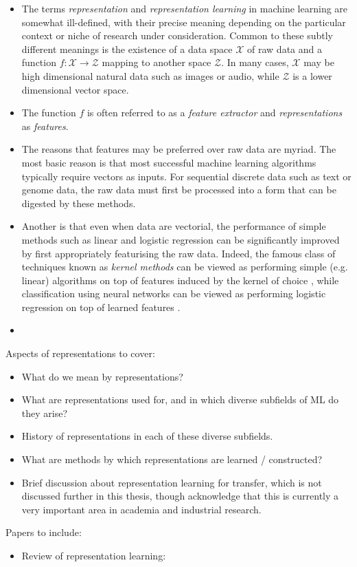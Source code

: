 \begin{itemize}
\item The terms \emph{representation} and \emph{representation learning} in machine learning are somewhat ill-defined, with their precise meaning depending on the particular context or niche of research under consideration. Common to these subtly different meanings is the existence of a data space $\mathcal{X}$ of raw data and a function $f:\mathcal{X} \to \mathcal{Z}$ mapping to another space $\mathcal{Z}$. In many cases, $\mathcal{X}$ may be high dimensional natural data such as images or audio, while $\mathcal{Z}$ is a lower dimensional vector space.
\item The function $f$ is often referred to as a \emph{feature extractor} and \emph{representations} as \emph{features}.
\item The reasons that features may be preferred over raw data are myriad. The most basic reason is that most successful machine learning algorithms typically require vectors as inputs. For sequential discrete data such as text or genome data, the raw data must first be processed into a form that can be digested by these methods.
\item Another is that even when data are vectorial, the performance of simple methods such as linear and logistic regression can be significantly improved by first appropriately featurising the raw data. Indeed, the famous class of techniques known as \emph{kernel methods} can be viewed as performing simple (e.g. linear) algorithms on top of features induced by the kernel of choice \citep{scholkopf2001learning, rasmussen2006gaussian}, while classification using neural networks can be viewed as performing logistic regression on top of learned features \citep{goodfellow2016deep}.
\item 
\end{itemize}

Aspects of representations to cover:

\begin{itemize}
\item What do we mean by representations?
\item What are representations used for, and in which diverse subfields of ML do they arise?
\item History of representations in each of these diverse subfields.
\item What are methods by which representations are learned / constructed?
\item Brief discussion about representation learning for transfer, which is not discussed further in this thesis, though acknowledge that this is currently a very important area in academia and industrial research.
\end{itemize}




Papers to include:
\begin{itemize}
\item Review of representation learning: \cite{bengio2013representation}
\end{itemize}